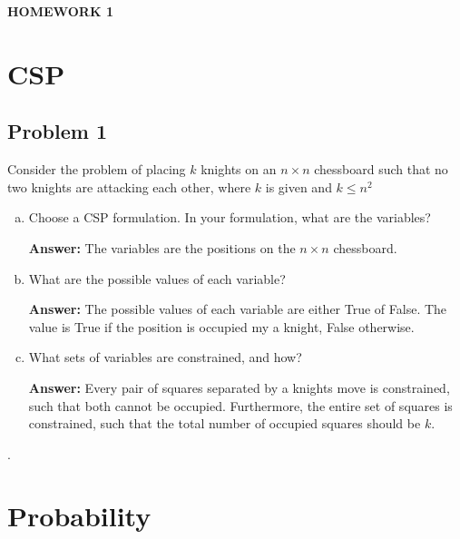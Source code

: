 \documentclass[]{article}
\begin{document}
\centerline{\bf \Large HOMEWORK 1} 

\medskip
\section{CSP}
\subsection*{Problem 1}
Consider the problem of placing $k$ knights on an $n\times n$ chessboard such that no two knights are attacking each other, where $k$ is given and $k\leq n^2$
\begin{enumerate}[a.]
\item Choose a CSP formulation. In your formulation, what are the variables?
\par \textbf{Answer: }The variables are the positions on the $n\times n$ chessboard.
\item What are the possible values of each variable?
\par \textbf{Answer: }The possible values of each variable are either True of False. The value is True if the position is occupied my a knight, False otherwise.
\item What sets of variables are constrained, and how?
\par \textbf{Answer: }Every pair of squares separated by a knights move is constrained, such that both cannot be occupied. Furthermore, the entire set of squares is constrained, such that the total number of occupied squares should be $k$.
\end{enumerate} .

\section{Probability}
\end{document}
